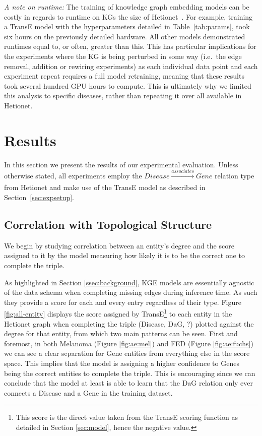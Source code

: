 \emph{A note on runtime:} The training of knowledge graph embedding models can be costly in regards to runtime on KGs the size of Hetionet~\cite{bonner2021understanding}. For example, training a TransE model with the hyperparameters detailed in Table~\ref{tab:params}, took six hours on the previously detailed hardware. All other models demonstrated runtimes equal to, or often, greater than this. This has particular implications for the experiments where the KG is being perturbed in some way (i.e.\ the edge removal, addition or rewiring experiments) as each individual data point and each experiment repeat requires a full model retraining, meaning that these results took several hundred GPU hours to compute. This is ultimately why we limited this analysis to specific diseases, rather than repeating it over all available in Hetionet.\section{Results}\label{sec:results}

In this section we present the results of our experimental evaluation. Unless otherwise stated, all experiments employ the \(\mathit{Disease} \xrightarrow[]{\mathit{associates}} \mathit{Gene}\) relation type from Hetionet and make use of the TransE model as described in Section~\ref{sec:expsetup}.

\subsection{Correlation with Topological Structure}\label{ssec:cor-top}

We begin by studying correlation between an entity's degree and the score assigned to it by the model measuring how likely it is to be the correct one to complete the triple.

As highlighted in Section \ref{ssec:background}, KGE models are essentially agnostic of the data schema when completing missing edges during inference time. As such they provide a score for each and every entry regardless of their type. Figure \ref{fig:all-entity} displays the score assigned by TransE\footnote{This score is the direct value taken from the TransE scoring function as detailed in Section \ref{sec:model}, hence the negative value.} to each entity in the Hetionet graph when completing the triple (Disease, DaG, ?) plotted against the degree for that entity, from which two main patterns can be seen. First and foremost, in both Melanoma (Figure \ref{fig:ae:mel}) and FED (Figure \ref{fig:ae:fuchs}) we can see a clear separation for Gene entities from everything else in the score space. This implies that the model is assigning a higher confidence to Genes being the correct entities to complete the triple. This is encouraging since we can conclude that the model at least is able to learn that the DaG relation only ever connects a Disease and a Gene in the training dataset.

